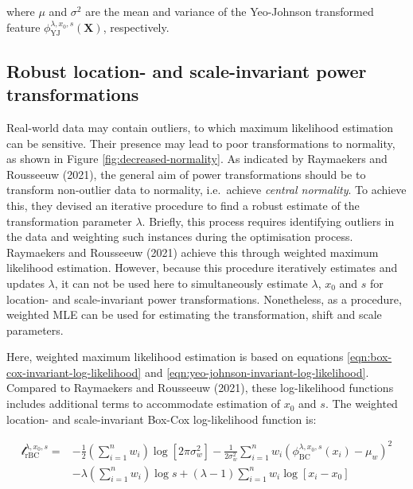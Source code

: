 \documentclass[
  a4paper,
]{article}
\begin{document}
where \(\mu\) and \(\sigma^2\) are the mean and variance of the
Yeo-Johnson transformed feature
\(\phi_{\text{YJ}}^{\lambda, x_0, s} (\mathbf{X})\), respectively.

\subsection{Robust location- and scale-invariant power
transformations}\label{robust-location--and-scale-invariant-power-transformations}

Real-world data may contain outliers, to which maximum likelihood
estimation can be sensitive. Their presence may lead to poor
transformations to normality, as shown in Figure
\ref{fig:decreased-normality}. As indicated by Raymaekers and Rousseeuw
(2021), the general aim of power transformations should be to transform
non-outlier data to normality, i.e.~achieve \emph{central normality}. To
achieve this, they devised an iterative procedure to find a robust
estimate of the transformation parameter \(\lambda\). Briefly, this
process requires identifying outliers in the data and weighting such
instances during the optimisation process. Raymaekers and Rousseeuw
(2021) achieve this through weighted maximum likelihood estimation.
However, because this procedure iteratively estimates and updates
\(\lambda\), it can not be used here to simultaneously estimate
\(\lambda\), \(x_0\) and \(s\) for location- and scale-invariant power
transformations. Nonetheless, as a procedure, weighted MLE can be used
for estimating the transformation, shift and scale parameters.

Here, weighted maximum likelihood estimation is based on equations
\ref{eqn:box-cox-invariant-log-likelihood} and
\ref{eqn:yeo-johnson-invariant-log-likelihood}. Compared to Raymaekers
and Rousseeuw (2021), these log-likelihood functions includes additional
terms to accommodate estimation of \(x_0\) and \(s\). The weighted
location- and scale-invariant Box-Cox log-likelihood function is:

\begin{equation}
\label{eqn:box-cox-weighted-invariant-log-likelihood}
\begin{split}
\mathcal{l}_{\text{rBC}}^{\lambda, x_0, s} = & -\frac{1}{2} \left(\sum_{i=1}^n w_i \right) \log \left[ 2 \pi \sigma_w^2 \right] -\frac{1}{2 \sigma_w^2} \sum_{i=1}^n w_i \left( \phi_{\text{BC}}^{\lambda, x_0, s}(x_i) - \mu_w \right)^2 \\
& - \lambda \left( \sum_{i=1}^n w_i \right) \log s + \left( \lambda - 1 \right) \sum_{i=1}^n w_i \log \left[ x_i - x_0 \right]
\end{split}
\end{equation}
\end{document}
